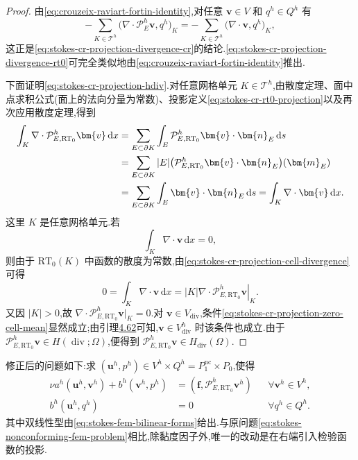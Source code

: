 \begin{proof}
由\cref{eq:crouzeix-raviart-fortin-identity},对任意 $\bm{v}\in V$ 和 $q^h\in Q^h$ 有
\[
  -\sum_{K\in\mathcal{T}^h}
      \bigl(\nabla\cdot\mathcal{P}_E^h\bm{v},q^h\bigr)_K
  =
  -\sum_{K\in\mathcal{T}^h}
      \bigl(\nabla\cdot\bm{v},q^h\bigr)_K,
\]
这正是\cref{eq:stokes-cr-projection-divergence-cr}的结论.\cref{eq:stokes-cr-projection-divergence-rt0}可完全类似地由\cref{eq:crouzeix-raviart-fortin-identity}推出.

下面证明\cref{eq:stokes-cr-projection-hdiv}.对任意网格单元 $K\in\mathcal{T}^h$,由散度定理、面中点求积公式(面上的法向分量为常数)、投影定义\cref{eq:stokes-cr-rt0-projection}以及再次应用散度定理,得到
\begin{align}\label{eq:stokes-cr-projection-cell-divergence}
  \int_K\nabla\cdot\mathcal{P}_{E,\mathrm{RT}_0}^h\bm{v}\,\mathrm{d}x
  &=\sum_{E\subset\partial K}\int_E
      \mathcal{P}_{E,\mathrm{RT}_0}^h\bm{v}\cdot\bm{n}_E\,\mathrm{d}s\\
  &=\sum_{E\subset\partial K}|E|
      \bigl(\mathcal{P}_{E,\mathrm{RT}_0}^h\bm{v}\cdot\bm{n}_E\bigr)(\bm{m}_E)\notag\\
  &=\sum_{E\subset\partial K}\int_E\bm{v}\cdot\bm{n}_E\,\mathrm{d}s
   =\int_K\nabla\cdot\bm{v}\,\mathrm{d}x.\notag
\end{align}
这里 $K$ 是任意网格单元.若
\begin{equation}\label{eq:stokes-cr-projection-zero-cell-mean}
  \int_K\nabla\cdot\bm{v}\,\mathrm{d}x=0,
\end{equation}
则由于 $\mathrm{RT}_0(K)$ 中函数的散度为常数,由\cref{eq:stokes-cr-projection-cell-divergence}可得
\[
  0=\int_K\nabla\cdot\bm{v}\,\mathrm{d}x
    =|K|\left.\nabla\cdot\mathcal{P}_{E,\mathrm{RT}_0}^h\bm{v}\right|_K.
\]
又因 $|K|>0$,故 $\nabla\cdot\mathcal{P}_{E,\mathrm{RT}_0}^h\bm{v}|_K=0$.对 $\bm{v}\in V_{\mathrm{div}}$,条件\cref{eq:stokes-cr-projection-zero-cell-mean}显然成立;由引理\hyperref[lem:stokes-nonconforming-cellwise-divergence-free]{4.62}可知,$\bm{v}\in V_{\mathrm{div}}^h$ 时该条件也成立.由于 $\mathcal{P}_{E,\mathrm{RT}_0}^h\bm{v}\in H(\operatorname{div};\Omega)$,便得到
$\mathcal{P}_{E,\mathrm{RT}_0}^h\bm{v}\in H_{\mathrm{div}}(\Omega)$.
\end{proof}

\begin{note}[修正后的问题]\label{note:stokes-modified-problem}
修正后的问题如下:求 $(\bm{u}^h,p^h)\in V^h\times Q^h=P_1^{\mathrm{nc}}\times P_0$,使得
\begin{equation}\label{eq:stokes-modified-cr-problem}
\begin{aligned}
  \nu a^h(\bm{u}^h,\bm{v}^h)+b^h(\bm{v}^h,p^h)
    &=(\bm{f},\mathcal{P}_{E,\mathrm{RT}_0}^h\bm{v}^h)
      &&\forall\bm{v}^h\in V^h,\\
  b^h(\bm{u}^h,q^h)&=0
      &&\forall q^h\in Q^h.
\end{aligned}
\end{equation}
其中双线性型由\cref{eq:stokes-fem-bilinear-forms}给出.与原问题\cref{eq:stokes-nonconforming-fem-problem}相比,除黏度因子外,唯一的改动是在右端引入检验函数的投影.
\end{note}

